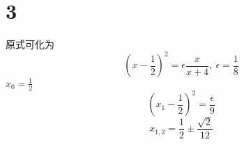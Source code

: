 \documentclass[12pt]{article}
\begin{document}
\section{3}

原式可化为
\begin{equation}
	\left(x-\frac{1}{2}\right)^2 = \epsilon \frac{x}{x+4},\ \epsilon = \frac{1}{8}
\end{equation}
$x_0 = \frac{1}{2}$
\begin{equation}
	\left(x_1-\frac{1}{2}\right)^2 = \frac{\epsilon}{9}
\end{equation}
\begin{equation}
	x_{1,2} = \frac{1}{2} \pm \frac{\sqrt{2}}{12}
\end{equation}







\nocite{*}


\end{document}
